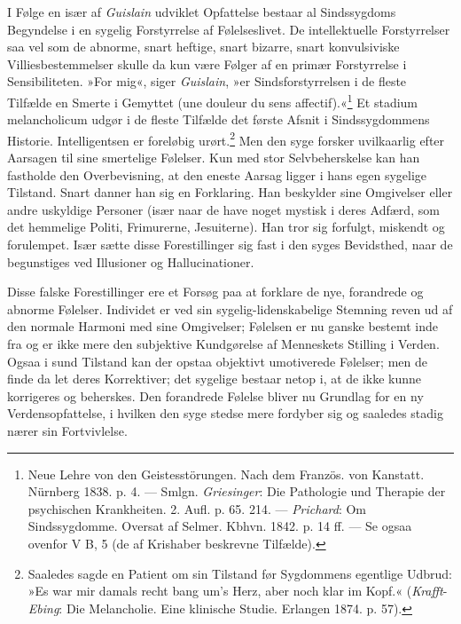 \documentclass[12pt,a4paper,openany]{book}
\newcommand{\opage}[1]{\marginnote{\footnotesize\textit{[#1]}}}
\begin{document}
I Følge en især af \emph{Guislain} udviklet Opfattelse bestaar al
Sindssygdoms Begyndelse i en sygelig Forstyrrelse af Følelseslivet. De
intellektuelle Forstyrrelser saa vel som de abnorme, snart heftige,
snart bizarre, snart konvulsiviske Villiesbestemmelser skulle da kun
være Følger af en primær Forstyrrelse i Sensibiliteten. »For mig«, siger
\emph{Guislain}, »er Sindsforstyrrelsen i de fleste Tilfælde en Smerte i
Gemyttet (une douleur du sens affectif).«\footnote[3]{Neue Lehre von den
Geistesstörungen. Nach dem Französ. von Kanstatt. Nürnberg 1838. p. 4.
--- Smlgn. \emph{Griesinger}: Die Pathologie und Therapie der
psychischen Krankheiten. 2. Aufl. p. 65. 214. --- \emph{Prichard}: Om
Sindssygdomme. Oversat af Selmer. Kbhvn. 1842. p. 14 ff. --- Se ogsaa
ovenfor V B, 5 (de af Krishaber beskrevne Tilfælde).} Et stadium
melancholicum udgør i de
\opage{363}fleste Tilfælde det første Afsnit i Sindssygdommens Historie.
Intelligentsen er foreløbig urørt.\footnote[1]{Saaledes sagde en Patient
om sin Tilstand før Sygdommens egentlige Udbrud: »Es war mir damals
recht bang um’s Herz, aber noch klar im Kopf.«
(\emph{Krafft}-\emph{Ebing}: Die Melancholie. Eine klinische Studie.
Erlangen 1874. p. 57).} Men den syge forsker uvilkaarlig efter Aarsagen
til sine smertelige Følelser. Kun med stor Selvbeherskelse kan han
fastholde den Overbevisning, at den eneste Aarsag ligger i hans egen
sygelige Tilstand. Snart danner han sig en Forklaring. Han beskylder
sine Omgivelser eller andre uskyldige Personer (især naar de have noget
mystisk i deres Adfærd, som det hemmelige Politi, Frimurerne,
Jesuiterne). Han tror sig forfulgt, miskendt og forulempet. Især sætte
disse Forestillinger sig fast i den syges Bevidsthed, naar de
begunstiges ved Illusioner og Hallucinationer.

Disse falske Forestillinger ere et Forsøg paa at forklare de nye,
forandrede og abnorme Følelser. Individet er ved sin
sygelig-lidenskabelige Stemning reven ud af den normale Harmoni med sine
Omgivelser; Følelsen er nu ganske bestemt inde fra og er ikke mere den
subjektive Kundgørelse af Menneskets Stilling i Verden. Ogsaa i sund
Tilstand kan der opstaa objektivt umotiverede Følelser; men de finde da
let deres Korrektiver; det sygelige bestaar netop i, at de ikke kunne
korrigeres og beherskes. Den forandrede Følelse bliver nu Grundlag for
en ny Verdensopfattelse, i hvilken den syge stedse mere fordyber sig og
saaledes stadig nærer sin Fortvivlelse.
\end{document}
